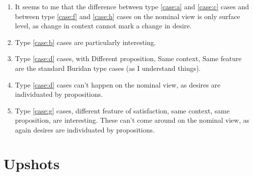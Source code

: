 \documentclass[10pt]{article}
\begin{document}
\begin{enumerate}
\item It seems to me that the difference between type \ref{case:a} and \ref{case:c} cases and between type \ref{case:f} and \ref{case:h} cases on the nominal view is only surface level, as change in context cannot mark a change in desire.
\item Type \ref{case:b} cases are particularly interesting.
\item Type \ref{case:d} cases, with Different proposition, Same context, Same feature are the standard Buridan type cases (as I understand things).
\item Type \ref{case:d} cases can't happen on the nominal view, as desires are individuated by propositions.
\item Type \ref{case:g} cases, different feature of satisfaction, same context, same proposition, are interesting.
  These can't come around on the nominal view, as again desires are individuated by propositions.
\end{enumerate}











\newpage

\section{Upshots}
\label{sec:upshots}
\end{document}
